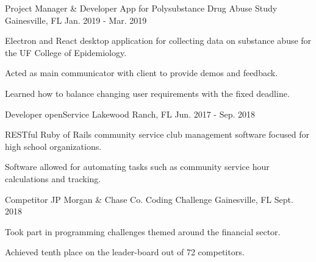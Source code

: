 \begin{cventries}
  \cventry
    {Project Manager \& Developer}
    {App for Polysubstance Drug Abuse Study}
    {Gainesville, FL}
    {Jan. 2019 - Mar. 2019}
    {
      \begin{cvitems}
        \item {Electron and React desktop application for collecting data on substance abuse for the UF College of Epidemiology.}
        \item {Acted as main communicator with client to provide demos and feedback.}
        \item {Learned how to balance changing user requirements with the fixed deadline.}
      \end{cvitems}
    }
  \cventry
    {Developer}
    {openService}
    {Lakewood Ranch, FL}
    {Jun. 2017 - Sep. 2018}
    {
      \begin{cvitems}
        \item {RESTful Ruby of Rails community service club management software focused for high school organizations.}
        \item {Software allowed for automating tasks such as community service hour calculations and tracking.}
      \end{cvitems}
    }
  \cventry
    {Competitor}
    {JP Morgan \& Chase Co. Coding Challenge}
    {Gainesville, FL}
    {Sept. 2018}
    {
      \begin{cvitems}
        \item {Took part in programming challenges themed around the financial sector.}
        \item {Achieved tenth place on the leader-board out of 72 competitors.}
      \end{cvitems}
    }
\end{cventries}

